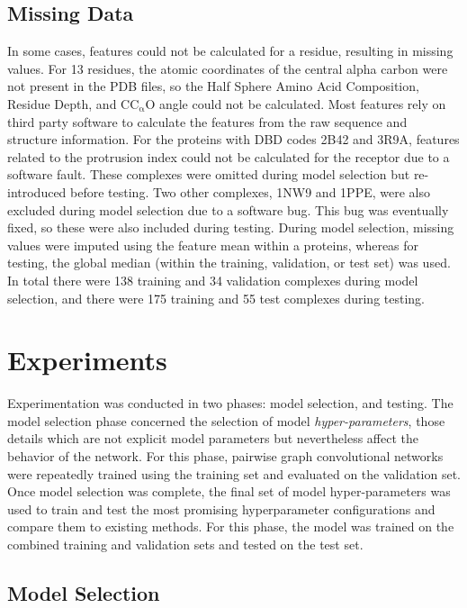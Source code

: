 \subsection{Missing Data}
In some cases, features could not be calculated for a residue, resulting in missing values.
For 13 residues, the atomic coordinates of the central alpha carbon were not present in the PDB files, so the Half Sphere Amino Acid Composition, Residue Depth, and $\mathrm{C C_{\alpha} O}$ angle could not be calculated.
Most features rely on third party software to calculate the features from the raw sequence and structure information.
For the proteins with DBD codes 2B42 and 3R9A, features related to the protrusion index could not be calculated for the receptor due to a software fault.
These complexes were omitted during model selection but re-introduced before testing.
Two other complexes, 1NW9 and 1PPE, were also excluded during model selection due to a software bug.
This bug was eventually fixed, so these were also included during testing. 
During model selection, missing values were imputed using the feature mean within a proteins, whereas for testing, the global median (within the training, validation, or test set) was used.
In total there were 138 training and 34 validation complexes during model selection, and there were 175 training and 55 test complexes during testing.

\section{Experiments}

Experimentation was conducted in two phases: model selection, and testing.
The model selection phase concerned the selection of model \emph{hyper-parameters}, those details which are not explicit model parameters but nevertheless affect the behavior of the network.
For this phase, pairwise graph convolutional networks were repeatedly trained using the training set and evaluated on the validation set.
Once model selection was complete, the final set of model hyper-parameters was used to train and test the most promising hyperparameter configurations and compare them to existing methods.
For this phase, the model was trained on the combined training and validation sets and tested on the test set.


\subsection{Model Selection}

